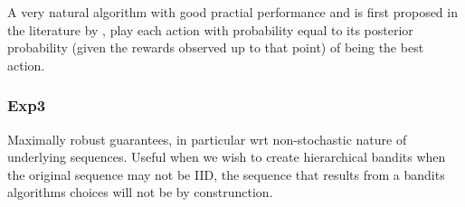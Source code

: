  A very natural algorithm with good practial performance and is first proposed in the literature by \cite{thompson:33}, play each action with probability equal to its posterior probability (given the rewards observed up to that point) of being the best action.








\subsubsection{Exp3}

 Maximally robust guarantees, in particular wrt non-stochastic nature of underlying sequences. Useful when we wish to create hierarchical bandits when the original sequence may not be IID, the sequence that results from a bandits algorithms choices will not be by construnction.

